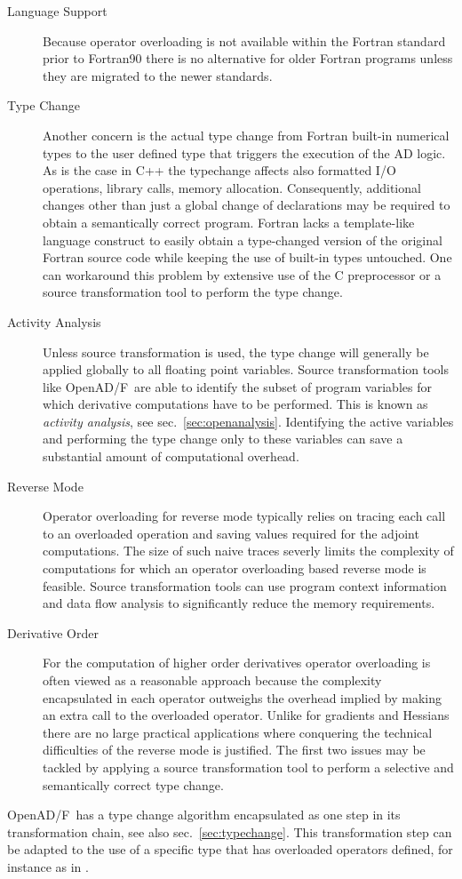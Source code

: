 \documentclass{book}
\newcommand{\OpenADF}{OpenAD/F}
\newcommand{\refsec}[1]{{sec.~\ref{#1}}}
\begin{document}
\begin{description}
\item[Language Support]
Because operator overloading is not available within the Fortran standard prior to Fortran90 
there is no alternative for older Fortran programs unless they are migrated to the newer standards.
\item[Type Change]
Another concern is the actual type change from Fortran built-in numerical types to 
the user defined type that triggers the execution of the AD logic. 
As is the case in C++ the typechange affects also formatted I/O operations, 
library calls, memory allocation. Consequently, additional changes other than just a global 
change of declarations may be required to obtain a semantically correct program. 
Fortran lacks a template-like language construct to easily obtain 
a type-changed version of the original Fortran source code while keeping 
the use of built-in types untouched.
One can  workaround this problem  by extensive use of 
the C preprocessor or a source transformation tool to perform the type change. 
\item[Activity Analysis] 
Unless source transformation is used, the type change will generally be applied globally to all 
floating point variables. Source transformation tools like \OpenADF\ are able to identify 
the subset of program variables for which derivative computations have to be performed. 
This is known as {\em activity analysis}, see \refsec{sec:openanalysis}. 
Identifying the active variables and performing the type change only to these variables 
can save a substantial amount of computational overhead.
\item[Reverse Mode]
Operator overloading for reverse mode typically relies on tracing each call  
to an  overloaded operation and saving values required for the adjoint computations.
The size of such naive traces severly limits the complexity of computations
for which an operator overloading based reverse mode is feasible.  
Source transformation tools can use program context information and data flow analysis 
to significantly reduce the memory requirements.      
\item[Derivative Order]
For the computation of higher order derivatives operator overloading is often 
viewed as a reasonable approach because the complexity encapsulated in each operator 
outweighs the overhead implied by making an extra call to the overloaded operator.
Unlike for gradients and Hessians there are no large practical applications where 
conquering the technical difficulties of the reverse mode is justified. 
The first two issues may be tackled by applying a source transformation tool to 
perform a selective and semantically correct type change. 
\end{description}
\OpenADF\ has a type change algorithm encapsulated as one step in its transformation chain, see also \refsec{sec:typechange}.
This transformation step can be adapted to the use of a specific type that has overloaded operators defined, for 
instance as in \cite{rapsodiaWeb}.
\end{document}
